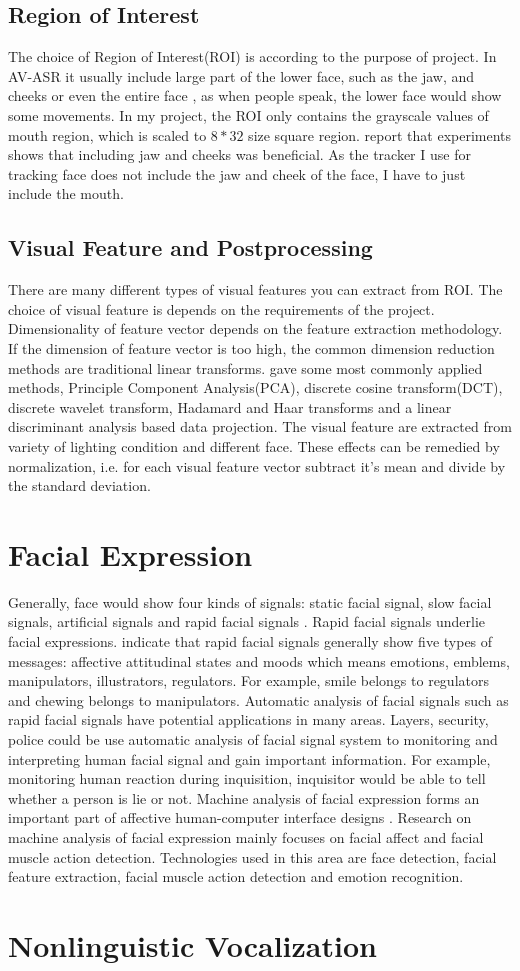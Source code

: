 \subsection{Region of Interest}
The choice of Region of Interest(ROI) is according to the purpose of project. In AV-ASR it usually include large part of the lower face, such as the jaw, and cheeks or even the entire face \cite{potamianos2003recent}, as when people speak, the lower face would show some movements. In my project, the ROI only contains the grayscale values of mouth region, which is scaled to $8 * 32$ size square region. \cite{potamianos2003recent} report that experiments shows that including jaw and cheeks was beneficial. As the tracker I use for tracking face does not include the jaw and cheek of the face, I have to just include the mouth.
\subsection{Visual Feature and Postprocessing}
There are many different types of visual features you can extract from ROI. The choice of visual feature is depends on the requirements of the project. Dimensionality of feature vector depends on the feature extraction methodology. If the dimension of feature vector is too high, the common dimension reduction methods are traditional linear transforms. \cite{potamianos2003recent} gave some most commonly applied methods, Principle Component Analysis(PCA), discrete cosine transform(DCT), discrete wavelet transform, Hadamard and Haar transforms and a linear discriminant analysis based data projection. The visual feature are extracted from variety of lighting condition and different face. These effects can be remedied by normalization, i.e. for each visual feature vector subtract it's mean and divide by the standard deviation.
\section{Facial Expression}
Generally, face would show four kinds of signals: static facial signal, slow facial signals, artificial signals and rapid facial signals \cite{pantic2007machine}. Rapid facial signals underlie facial expressions. \cite{pantic2007machine} indicate that rapid facial signals generally show five types of messages: affective attitudinal states and moods which means emotions, emblems, manipulators, illustrators, regulators. For example, smile belongs to regulators and chewing belongs to manipulators. Automatic analysis of facial signals such as rapid facial signals have potential applications in many areas. Layers, security, police could be use automatic analysis of facial signal system to monitoring and interpreting human facial signal and gain important information. For example, monitoring human reaction during inquisition, inquisitor would be able to tell whether a person is lie or not.  Machine analysis of facial expression forms an important part of affective human-computer interface designs \cite{pantic2007machine}.  Research on machine analysis of facial expression mainly focuses on facial affect and facial muscle action detection\cite{pantic2007machine}. Technologies used in this area are face detection, facial feature extraction, facial muscle action detection and emotion recognition\cite{pantic2007machine}.
\section{Nonlinguistic Vocalization}
